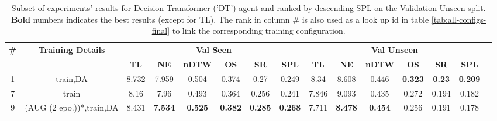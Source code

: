 \begin{table}
\centering
\caption{\label{tab:dt_final}Subset of experiments' results for Decision Transformer ('DT') agent and ranked by descending SPL on the Validation Unseen split. \textbf{Bold} numbers indicates the best results (except for TL). The rank in column \# is also used as a look up id in table \ref{tab:all-configs-final} to link the corresponding training configuration.}
\begin{tabular}{@{\hskip3pt}c@{\hskip3pt}c@{\hskip3pt}c@{\hskip3pt}c@{\hskip3pt}c@{\hskip3pt}c@{\hskip3pt}c@{\hskip3pt}c@{\hskip3pt}c@{\hskip3pt}c@{\hskip3pt}c@{\hskip3pt}c@{\hskip3pt}c@{\hskip3pt}c@{\hskip3pt}c}
\toprule
                                  \textbf{\#} & \textbf{Training Details} & \multicolumn{6}{c}{\textbf{Val Seen}} & \multicolumn{6}{c}{\textbf{Val Unseen}} \\
\cmidrule(l){3-8}\cmidrule(l){9-14}\textbf{~} &                \textbf{~} &       \textbf{TL} &     \textbf{NE} &   \textbf{nDTW} &     \textbf{OS} &     \textbf{SR} &    \textbf{SPL} &         \textbf{TL} &     \textbf{NE} &   \textbf{nDTW} &     \textbf{OS} &    \textbf{SR} &    \textbf{SPL} \\
\midrule
                                            1 &                  train,DA &             8.732 &           7.959 &           0.504 &           0.374 &            0.27 &           0.249 &                8.34 &           8.608 &           0.446 &  \textbf{0.323} &  \textbf{0.23} &  \textbf{0.209} \\
                                            7 &                     train &              8.16 &            7.96 &           0.493 &           0.364 &           0.256 &           0.241 &               7.846 &           9.093 &           0.435 &           0.272 &          0.194 &           0.182 \\
                                            9 &  (AUG (2 epo.))*,train,DA &             8.431 &  \textbf{7.534} &  \textbf{0.525} &  \textbf{0.382} &  \textbf{0.285} &  \textbf{0.268} &               7.711 &  \textbf{8.478} &  \textbf{0.454} &           0.256 &          0.191 &           0.178 \\
\bottomrule
\end{tabular}
\end{table}
